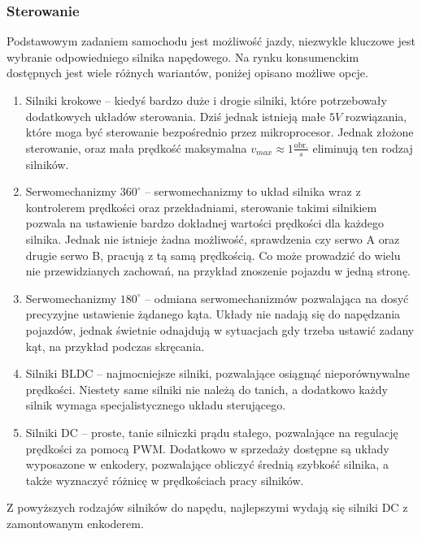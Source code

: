         \subsubsection{Sterowanie}
        \label{sec:engines}
            Podstawowym zadaniem samochodu jest możliwość jazdy, niezwykle kluczowe jest wybranie odpowiedniego silnika napędowego.
            Na rynku konsumenckim dostępnych jest wiele różnych wariantów, poniżej opisano możliwe opcje.
            \begin{enumerate}
                \item Silniki krokowe -- kiedyś bardzo duże i drogie silniki, które potrzebowały dodatkowych układów sterowania. 
                Dziś jednak istnieją małe $5V$ rozwiązania, które moga być sterowanie bezpośrednio przez mikroprocesor.
                Jednak złożone sterowanie, oraz mała prędkość maksymalna $v_{max} \approx 1 \frac{\text{obr.}}{s}$ eliminują ten rodzaj silników.
                \item Serwomechanizmy $360^\circ$ -- serwomechanizmy to układ silnika wraz z kontrolerem prędkości oraz przekładniami, sterowanie takimi silnikiem pozwala na ustawienie bardzo dokładnej wartości prędkości dla każdego silnika.
                Jednak nie istnieje żadna możliwość, sprawdzenia czy serwo A oraz drugie serwo B, pracują z tą samą prędkością. Co może prowadzić do wielu nie przewidzianych zachowań, na przykład znoszenie pojazdu w jedną stronę.
                \item Serwomechanizmy $180^\circ$ -- odmiana serwomechanizmów pozwalająca na dosyć precyzyjne ustawienie żądanego kąta. 
                Układy nie nadają się do napędzania pojazdów, jednak świetnie odnajdują w sytuacjach gdy trzeba ustawić zadany kąt, na przykład podczas skręcania.
                \item Silniki BLDC -- najmocniejsze silniki, pozwalające osiągnąć nieporównywalne prędkości.
                Niestety same silniki nie należą do tanich, a dodatkowo każdy silnik wymaga specjalistycznego układu sterującego.
                \item Silniki DC -- proste, tanie silniczki prądu stałego, pozwalające na regulację prędkości za pomocą PWM. 
                Dodatkowo w sprzedaży dostępne są układy wyposazone w enkodery, pozwalające obliczyć średnią szybkość silnika, 
                a także wyznaczyć różnicę w prędkościach pracy silników.
            \end{enumerate}
            Z powyższych rodzajów silników do napędu, najlepszymi wydają się silniki DC z zamontowanym enkoderem.

